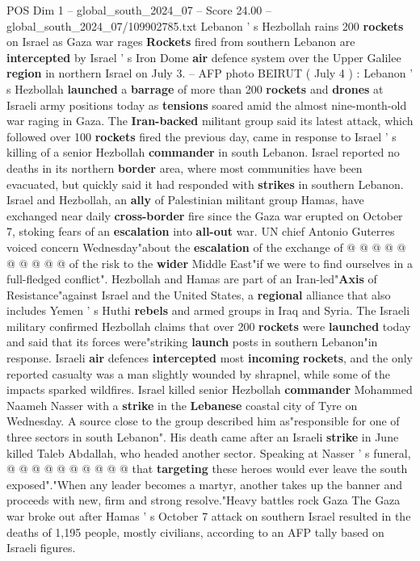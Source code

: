\begin{textsample}{POS Dim 1 – global\_south\_2024\_07 – Score 24.00 – global\_south\_2024\_07/109902785.txt}  \label{ex:f1_pos_067}
Lebanon ' s Hezbollah rains 200 \textbf{rockets} on Israel as Gaza war rages \textbf{Rockets} fired from southern Lebanon are \textbf{intercepted} by Israel ' s Iron Dome \textbf{air} defence system over the Upper Galilee \textbf{region} in northern Israel on July 3. -- AFP photo BEIRUT ( July 4 ) : Lebanon ' s Hezbollah \textbf{launched} a \textbf{barrage} of more than 200 \textbf{rockets} and \textbf{drones} at Israeli army positions today as \textbf{tensions} soared amid the almost nine-month-old war raging in Gaza.
The \textbf{Iran-backed} militant group said its latest attack, which followed over 100 \textbf{rockets} fired the previous day, came in response to Israel ' s killing of a senior Hezbollah \textbf{commander} in south Lebanon.
Israel reported no deaths in its northern \textbf{border} area, where most communities have been evacuated, but quickly said it had responded with \textbf{strikes} in southern Lebanon.
Israel and Hezbollah, an \textbf{ally} of Palestinian militant group Hamas, have exchanged near daily \textbf{cross-border} fire since the Gaza war erupted on October 7, stoking fears of an \textbf{escalation} into \textbf{all-out} war.
UN chief Antonio Guterres voiced concern Wednesday"about the \textbf{escalation} of the exchange of @ @ @ @ @ @ @ @ @ @ of the risk to the \textbf{wider} Middle East"if we were to find ourselves in a full-fledged conflict".
Hezbollah and Hamas are part of an Iran-led"\textbf{Axis} of Resistance"against Israel and the United States, a \textbf{regional} alliance that also includes Yemen ' s Huthi \textbf{rebels} and armed groups in Iraq and Syria.
The Israeli military confirmed Hezbollah claims that over 200 \textbf{rockets} were \textbf{launched} today and said that its forces were"striking \textbf{launch} posts in southern Lebanon"in response.
Israeli \textbf{air} defences \textbf{intercepted} most \textbf{incoming} \textbf{rockets}, and the only reported casualty was a man slightly wounded by shrapnel, while some of the impacts sparked wildfires.
Israel killed senior Hezbollah \textbf{commander} Mohammed Naameh Nasser with a \textbf{strike} in the \textbf{Lebanese} coastal city of Tyre on Wednesday.
A source close to the group described him as"responsible for one of three sectors in south Lebanon".
His death came after an Israeli \textbf{strike} in June killed Taleb Abdallah, who headed another sector.
Speaking at Nasser ' s funeral, @ @ @ @ @ @ @ @ @ @ that \textbf{targeting} these heroes would ever leave the south exposed"."When any leader becomes a martyr, another takes up the banner and proceeds with new, firm and strong resolve."Heavy battles rock Gaza The Gaza war broke out after Hamas ' s October 7 attack on southern Israel resulted in the deaths of 1,195 people, mostly civilians, according to an AFP tally based on Israeli figures.

\end{textsample}
